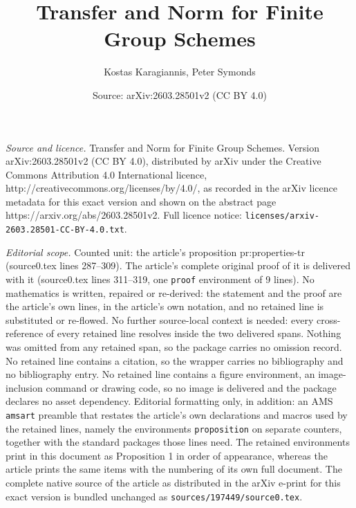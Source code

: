 \documentclass[10pt,a4paper]{amsart}
\title{Transfer and Norm for Finite Group Schemes}
\author{Kostas Karagiannis, Peter Symonds}
\date{Source: arXiv:2603.28501v2 (CC BY 4.0)}
\begin{document}
\maketitle

\noindent\emph{Source and licence.} Transfer and Norm for Finite Group Schemes. Version arXiv:2603.28501v2 (CC BY 4.0), distributed by arXiv under the Creative Commons Attribution 4.0 International licence, http://creativecommons.org/licenses/by/4.0/, as recorded in the arXiv licence metadata for this exact version and shown on the abstract page https://arxiv.org/abs/2603.28501v2. Full licence notice: \texttt{licenses/arxiv-2603.28501-CC-BY-4.0.txt}.\par\smallskip

\noindent\textit{Editorial scope.} Counted unit: the article's proposition pr:properties-tr (source0.tex lines 287--309). The article's complete original proof of it is delivered with it (source0.tex lines 311--319, one \texttt{proof} environment of 9 lines). No mathematics is written, repaired or re-derived: the statement and the proof are the article's own lines, in the article's own notation, and no retained line is substituted or re-flowed.  No further source-local context is needed: every cross-reference of every retained line resolves inside the two delivered spans.  Nothing was omitted from any retained span, so the package carries no omission record.  No retained line contains a citation, so the wrapper carries no bibliography and no bibliography entry.  No retained line contains a figure environment, an image-inclusion command or drawing code, so no image is delivered and the package declares no asset dependency.  Editorial formatting only, in addition: an AMS \texttt{amsart} preamble that restates the article's own declarations and macros used by the retained lines, namely the environments \texttt{proposition} on separate counters, together with the standard packages those lines need.  The retained environments print in this document as Proposition 1 in order of appearance, whereas the article prints the same items with the numbering of its own full document.  The complete native source of the article as distributed in the arXiv e-print for this exact version is bundled unchanged as \texttt{sources/197449/source0.tex}.
\end{document}
